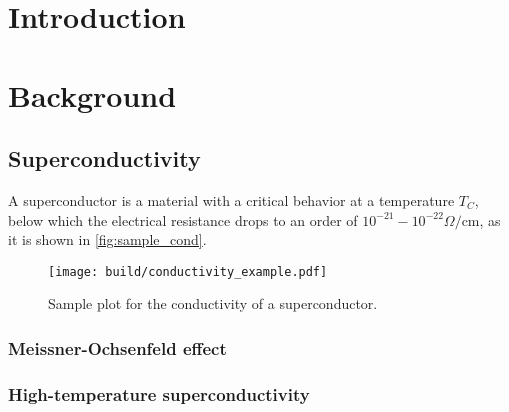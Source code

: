 \section{Introduction}
\label{sec:introduction}

\section{Background}
\label{sec:Background}

\subsection{Superconductivity}
A superconductor is a material with a critical behavior at a temperature $T_C$, below which the
electrical resistance drops to an order of $10^{-21} - 10^{-22} \Omega / \text{cm}$, as it is shown
in \autoref{fig:sample_cond}.

\label{sec:Superconductivity}
\begin{figure}
  \centering
  \texttt{[image: build/conductivity\_example.pdf]}
  \caption{Sample plot for the conductivity of a superconductor.}
  \label{fig:sample_cond}
\end{figure}

\subsubsection{Meissner-Ochsenfeld effect}

\subsubsection{High-temperature superconductivity}
\label{sec:intr:high-tc}

